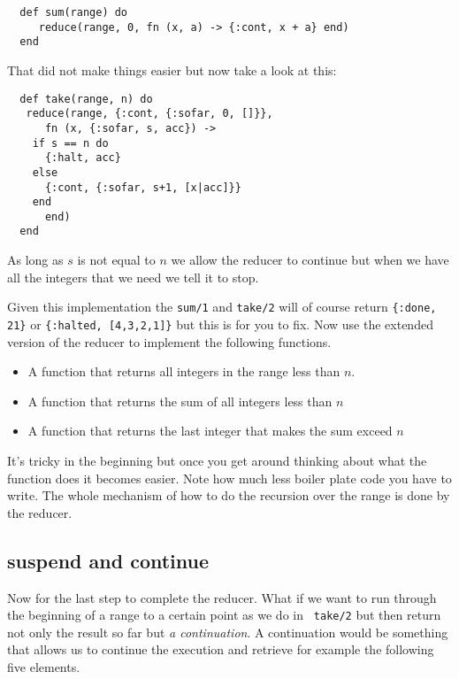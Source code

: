 \documentclass[a4paper,11pt]{article}
\begin{document}
\begin{verbatim}
  def sum(range) do
     reduce(range, 0, fn (x, a) -> {:cont, x + a} end)
  end
\end{verbatim}

\noindent That did not make things easier but now take a look at this:

\begin{verbatim}
  def take(range, n) do
   reduce(range, {:cont, {:sofar, 0, []}},
      fn (x, {:sofar, s, acc}) ->
	if s == n do
	  {:halt, acc}
	else
	  {:cont, {:sofar, s+1, [x|acc]}}
	end
      end)
  end
\end{verbatim}

\noindent As long as $s$ is not equal to $n$ we allow the reducer to continue
but when we have all the integers that we need we tell it to stop.

Given this implementation the {\tt sum/1} and {\tt take/2} will of
course return {\tt \{:done, 21\}} or {\tt \{:halted, [4,3,2,1]\}} but
this is for you to fix. Now use the extended version of the reducer to
implement the following functions.

\begin{itemize}
\item A function that returns all integers in the range less than $n$.
  
\item A function that returns the sum of all integers less than $n$

\item A function that returns the last integer that makes the sum exceed $n$

\end{itemize}

\noindent It's tricky in the beginning but once you get around thinking about
what the function does it becomes easier. Note how much less boiler
plate code you have to write. The whole mechanism of how to do the
recursion over the range is done by the reducer.

\subsection{suspend and continue}

Now for the last step to complete the reducer. What if we want to run
through the beginning of a range to a certain point as we do in {\tt
  take/2} but then return not only the result so far but {\em a
  continuation}. A continuation would be something that allows us to
continue the execution and retrieve for example the following five
elements.
\end{document}
